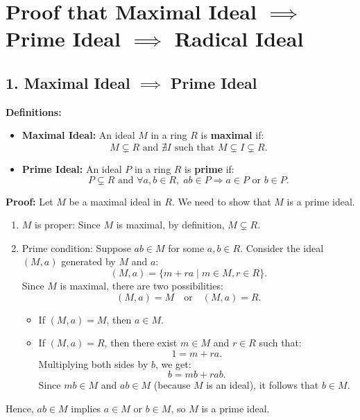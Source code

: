 \documentclass[11pt,openany]{article}
\begin{document}
\section*{Proof that Maximal Ideal \( \implies \) Prime Ideal \( \implies \) Radical Ideal}

\subsection*{1. Maximal Ideal \( \implies \) Prime Ideal}

\textbf{Definitions:}
\begin{itemize}
	\item \textbf{Maximal Ideal:} An ideal \( M \) in a ring \( R \) is \textbf{maximal} if:
	\[
	M \subsetneq R \text{ and } \nexists I \text{ such that } M \subsetneq I \subsetneq R.
	\]
	
	\item \textbf{Prime Ideal:} An ideal \( P \) in a ring \( R \) is \textbf{prime} if:
	\[
	P \subsetneq R \text{ and } \forall a, b \in R, \; ab \in P \Rightarrow a \in P \text{ or } b \in P.
	\]
\end{itemize}

\textbf{Proof:} Let \( M \) be a maximal ideal in \( R \). We need to show that \( M \) is a prime ideal.

\begin{enumerate}
	\item \( M \) is proper: Since \( M \) is maximal, by definition, \( M \subsetneq R \).
	
	\item Prime condition: Suppose \( ab \in M \) for some \( a, b \in R \). Consider the ideal \( (M, a) \) generated by \( M \) and \( a \):
	\[
	(M, a) = \{ m + ra \mid m \in M, r \in R \}.
	\]
	Since \( M \) is maximal, there are two possibilities:
	\[
	(M, a) = M \quad \text{or} \quad (M, a) = R.
	\]
	\begin{itemize}
		\item If \( (M, a) = M \), then \( a \in M \).
		\item If \( (M, a) = R \), then there exist \( m \in M \) and \( r \in R \) such that:
		\[
		1 = m + ra.
		\]
		Multiplying both sides by \( b \), we get:
		\[
		b = mb + rab.
		\]
		Since \( mb \in M \) and \( ab \in M \) (because \( M \) is an ideal), it follows that \( b \in M \).
	\end{itemize}
\end{enumerate}

Hence, \( ab \in M \) implies \( a \in M \) or \( b \in M \), so \( M \) is a prime ideal.
\end{document}
